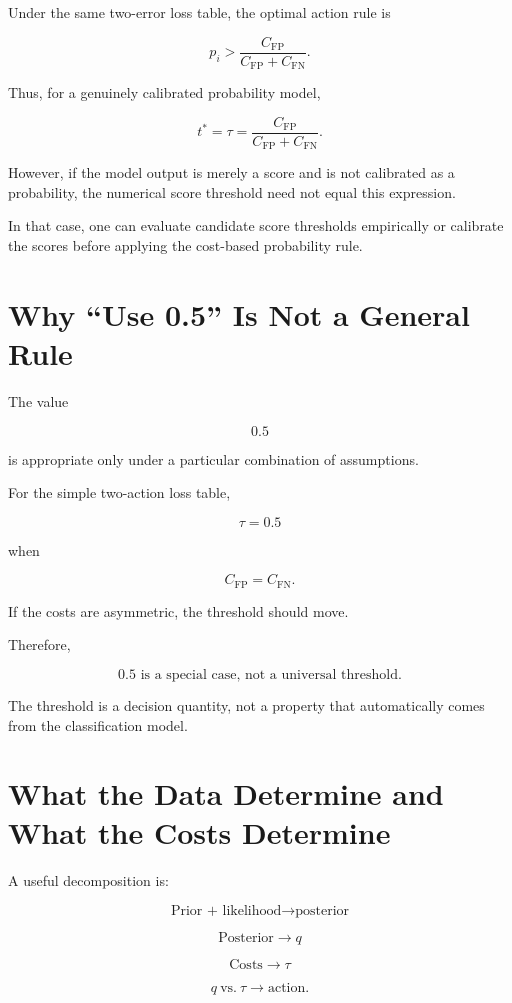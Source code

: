 \documentclass[11pt]{article}
\newcommand{\CFP}{C_{\mathrm{FP}}}
\newcommand{\CFN}{C_{\mathrm{FN}}}
\begin{document}
Under the same two-error loss table, the optimal action rule is

\[
\boxed{
p_i
>
\frac{\CFP}{\CFP+\CFN}.
}
\]

Thus, for a genuinely calibrated probability model,

\[
\boxed{
t^*
=
\tau
=
\frac{\CFP}{\CFP+\CFN}.
}
\]

However, if the model output is merely a score and is not calibrated as a probability, the numerical score threshold need not equal this expression.

In that case, one can evaluate candidate score thresholds empirically or calibrate the scores before applying the cost-based probability rule.

\section{Why ``Use 0.5'' Is Not a General Rule}

The value

\[
0.5
\]

is appropriate only under a particular combination of assumptions.

For the simple two-action loss table,

\[
\tau=0.5
\]

when

\[
\CFP=\CFN.
\]

If the costs are asymmetric, the threshold should move.

Therefore,

\[
\boxed{
0.5
\text{ is a special case, not a universal threshold.}
}
\]

The threshold is a decision quantity, not a property that automatically comes from the classification model.

\section{What the Data Determine and What the Costs Determine}

A useful decomposition is:

\[
\boxed{
\text{Prior + likelihood}
\longrightarrow
\text{posterior}
}
\]

\[
\boxed{
\text{Posterior}
\longrightarrow
q
}
\]

\[
\boxed{
\text{Costs}
\longrightarrow
\tau
}
\]

\[
\boxed{
q\ \text{vs.}\ \tau
\longrightarrow
\text{action}.
}
\]
\end{document}
